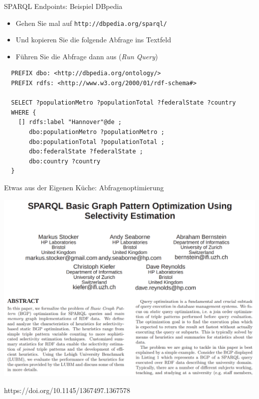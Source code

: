 \documentclass{beamer}
\begin{document}
\begin{frame}[fragile]{SPARQL Endpoints: Beispiel DBpedia}
	
	\begin{itemize}
		\item Gehen Sie mal auf \texttt{http://dbpedia.org/sparql/}
		\item Und kopieren Sie die folgende Abfrage ins Textfeld
		\item Führen Sie die Abfrage dann aus (\emph{Run Query})
	\end{itemize}
	
	\small
	\begin{lstlisting}
  PREFIX dbo: <http://dbpedia.org/ontology/>
  PREFIX rdfs: <http://www.w3.org/2000/01/rdf-schema#>

  SELECT ?populationMetro ?populationTotal ?federalState ?country
  WHERE {
    [] rdfs:label "Hannover"@de ;
       dbo:populationMetro ?populationMetro ;
       dbo:populationTotal ?populationTotal ;
       dbo:federalState ?federalState ;
       dbo:country ?country
  }
	\end{lstlisting}
	
\end{frame}

\begin{frame}{Etwas aus der Eigenen Küche: Abfragenoptimierung}
	
	\centering
	\includegraphics[scale=0.8]{optimization.png}
	
	\vspace{0.2cm}\scriptsize
	https://doi.org/10.1145/1367497.1367578
	
\end{frame}
\end{document}
